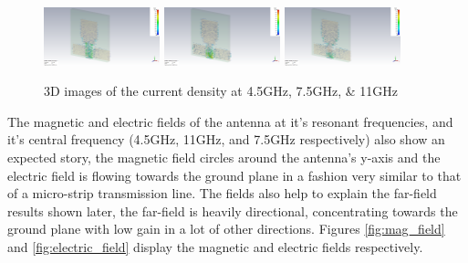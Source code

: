 \documentclass[colorlinks,11pt,a4paper,normalphoto,withhyper,ragged2e]{altareport}
\begin{document}
\begin{figure}[ht!]
\centering

		\includegraphics[width=0.3\textwidth]{Images/current-density-4.5GHz.png}
    	\hfill
		\includegraphics[width=0.3\textwidth]{Images/current-density-7.5GHz.png}
		\hfill
		\includegraphics[width=0.3\textwidth]{Images/current-density-11GHz.png}
	\caption{3D images of the current density at 4.5GHz, 7.5GHz, \& 11GHz}\label{fig:current_densities}
\end{figure}

\vspace{5mm}

The magnetic and electric fields of the antenna at it's resonant frequencies, and it's central frequency (4.5GHz, 11GHz, and 7.5GHz respectively) also show an expected story, the magnetic field circles around the antenna's y-axis and the electric field is flowing towards the ground plane in a fashion very similar to that of a micro-strip transmission line. The fields also help to explain the far-field results shown later, the far-field is heavily directional, concentrating towards the ground plane with low gain in a lot of other directions. Figures \ref{fig:mag_field} and \ref{fig:electric_field} display the magnetic and electric fields respectively. \linebreak
\end{document}
